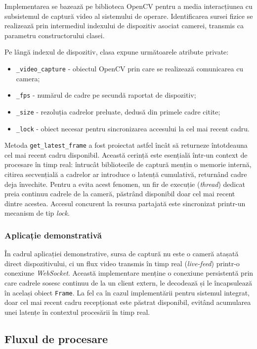 Implementarea se bazează pe biblioteca OpenCV pentru a media interacțiunea cu subsistemul de captură video al sistemului de operare. Identificarea sursei fizice se realizează prin intermediul indexului de dispozitiv asociat camerei, transmis ca parametru constructorului clasei.

Pe lângă indexul de dispozitiv, clasa expune următoarele atribute private:
\begin{itemize}
  \item{\texttt{\_video\_capture} - obiectul OpenCV prin care se realizează comunicarea cu camera;}
  \item{\texttt{\_fps} - numărul de cadre pe secundă raportat de dispozitiv;}
  \item{\texttt{\_size} - rezoluția cadrelor preluate, dedusă din primele cadre citite;}
  \item{\texttt{\_lock} - obiect necesar pentru sincronizarea accesului la cel mai recent cadru.}
\end{itemize}

Metoda \texttt{get\_latest\_frame} a fost proiectat astfel încât să returneze întotdeauna cel mai recent cadru disponibil. Această cerință este esențială într-un context de procesare în timp real: întrucât bibliotecile de captură mențin o memorie internă, citirea secvențială a cadrelor ar introduce o latență cumulativă, returnând cadre deja învechite. Pentru a evita acest fenomen, un fir de execuție (\textit{thread}) dedicat preia continuu cadrele de la cameră, păstrând disponibil doar cel mai recent dintre acestea. Accesul concurent la resursa partajată este sincronizat printr-un mecanism de tip \textit{lock}.

\subsubsection{Aplicație demonstrativă}
\indent\par
În cadrul aplicației demonstrative, sursa de captură nu este o cameră atașată direct dispozitivului, ci un flux video transmis în timp real (\textit{live-feed}) printr-o conexiune \textit{WebSocket}. Această implementare menține o conexiune persistentă prin care cadrele sosesc continuu de la un client extern, le decodează și le încapsulează în același obiect \texttt{Frame}. La fel ca în cazul implementării pentru sistemul integrat, doar cel mai recent cadru recepționat este păstrat disponibil, evitând acumularea unei latențe în contextul procesării în timp real.

\subsection{Fluxul de procesare}
\indent\par

